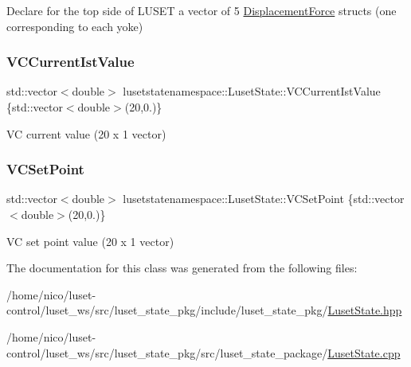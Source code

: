 Declare for the top side of L\+U\+S\+ET a vector of 5 \hyperlink{structlusetstatenamespace_1_1LusetState_1_1DisplacementForce}{Displacement\+Force} structs (one corresponding to each yoke) 

\mbox{\label{classlusetstatenamespace_1_1LusetState_afc512c3c96a1c7adb8b6d185d308fce7}} 
\subsubsection{\texorpdfstring{V\+C\+Current\+Ist\+Value}{VCCurrentIstValue}}
{\footnotesize\ttfamily std\+::vector$<$double$>$ lusetstatenamespace\+::\+Luset\+State\+::\+V\+C\+Current\+Ist\+Value \{std\+::vector$<$double$>$(20,0.)\}}



VC current value (20 x 1 vector) 

\mbox{\label{classlusetstatenamespace_1_1LusetState_a8e499f28768eb59644ac6a000d6b9422}} 
\subsubsection{\texorpdfstring{V\+C\+Set\+Point}{VCSetPoint}}
{\footnotesize\ttfamily std\+::vector$<$double$>$ lusetstatenamespace\+::\+Luset\+State\+::\+V\+C\+Set\+Point \{std\+::vector$<$double$>$(20,0.)\}}



VC set point value (20 x 1 vector) 



The documentation for this class was generated from the following files\+:\begin{DoxyCompactItemize}
\item 
/home/nico/luset-\/control/luset\+\_\+ws/src/luset\+\_\+state\+\_\+pkg/include/luset\+\_\+state\+\_\+pkg/\hyperlink{LusetState_8hpp}{Luset\+State.\+hpp}\item 
/home/nico/luset-\/control/luset\+\_\+ws/src/luset\+\_\+state\+\_\+pkg/src/luset\+\_\+state\+\_\+package/\hyperlink{LusetState_8cpp}{Luset\+State.\+cpp}\end{DoxyCompactItemize}
